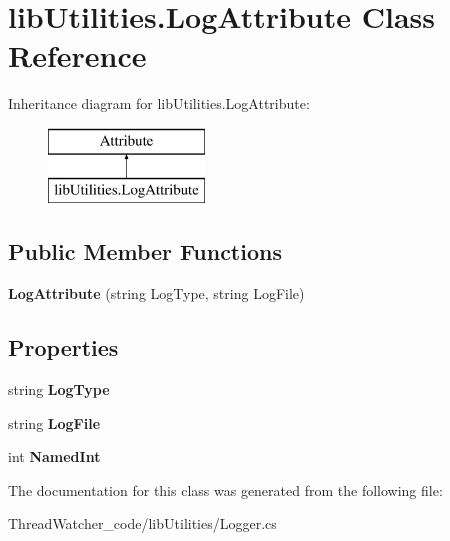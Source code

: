 \hypertarget{classlib_utilities_1_1_log_attribute}{\section{lib\+Utilities.\+Log\+Attribute Class Reference}
\label{classlib_utilities_1_1_log_attribute}
}
Inheritance diagram for lib\+Utilities.\+Log\+Attribute\+:\begin{figure}[H]
\begin{center}
\leavevmode
\includegraphics[height=2.000000cm]{classlib_utilities_1_1_log_attribute}
\end{center}
\end{figure}
\subsection*{Public Member Functions}
\begin{DoxyCompactItemize}
\item 
\hypertarget{classlib_utilities_1_1_log_attribute_a6d003f7d3231d12691eb6a045acc3b0c}{{\bfseries Log\+Attribute} (string Log\+Type, string Log\+File)}\label{classlib_utilities_1_1_log_attribute_a6d003f7d3231d12691eb6a045acc3b0c}

\end{DoxyCompactItemize}
\subsection*{Properties}
\begin{DoxyCompactItemize}
\item 
\hypertarget{classlib_utilities_1_1_log_attribute_a098e40a104863401b44df10a9baf146c}{string {\bfseries Log\+Type}}\label{classlib_utilities_1_1_log_attribute_a098e40a104863401b44df10a9baf146c}

\item 
\hypertarget{classlib_utilities_1_1_log_attribute_aa2c0f58a515053be7577a15f2f004183}{string {\bfseries Log\+File}}\label{classlib_utilities_1_1_log_attribute_aa2c0f58a515053be7577a15f2f004183}

\item 
\hypertarget{classlib_utilities_1_1_log_attribute_a75d4f8a2e168095a5524026de9f97ceb}{int {\bfseries Named\+Int}}\label{classlib_utilities_1_1_log_attribute_a75d4f8a2e168095a5524026de9f97ceb}

\end{DoxyCompactItemize}


The documentation for this class was generated from the following file\+:\begin{DoxyCompactItemize}
\item 
Thread\+Watcher\+\_\+code/lib\+Utilities/Logger.\+cs\end{DoxyCompactItemize}
